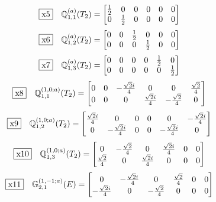 \documentclass[fleqn,10pt,landscape]{jsarticle}
\begin{document}
\begin{dmath*}
\fbox{x5}\quad \mathbb{Q}_{1,1}^{(a)}(T_{2})=\begin{bmatrix} \frac{1}{2} & 0 & 0 & 0 & 0 & 0 \\ 0 & \frac{1}{2} & 0 & 0 & 0 & 0 \end{bmatrix}
\end{dmath*}
\begin{dmath*}
\fbox{x6}\quad \mathbb{Q}_{1,2}^{(a)}(T_{2})=\begin{bmatrix} 0 & 0 & \frac{1}{2} & 0 & 0 & 0 \\ 0 & 0 & 0 & \frac{1}{2} & 0 & 0 \end{bmatrix}
\end{dmath*}
\begin{dmath*}
\fbox{x7}\quad \mathbb{Q}_{1,3}^{(a)}(T_{2})=\begin{bmatrix} 0 & 0 & 0 & 0 & \frac{1}{2} & 0 \\ 0 & 0 & 0 & 0 & 0 & \frac{1}{2} \end{bmatrix}
\end{dmath*}
\begin{dmath*}
\fbox{x8}\quad \mathbb{Q}_{1,1}^{(1,0;a)}(T_{2})=\begin{bmatrix} 0 & 0 & - \frac{\sqrt{2} i}{4} & 0 & 0 & \frac{\sqrt{2}}{4} \\ 0 & 0 & 0 & \frac{\sqrt{2} i}{4} & - \frac{\sqrt{2}}{4} & 0 \end{bmatrix}
\end{dmath*}
\begin{dmath*}
\fbox{x9}\quad \mathbb{Q}_{1,2}^{(1,0;a)}(T_{2})=\begin{bmatrix} \frac{\sqrt{2} i}{4} & 0 & 0 & 0 & 0 & - \frac{\sqrt{2} i}{4} \\ 0 & - \frac{\sqrt{2} i}{4} & 0 & 0 & - \frac{\sqrt{2} i}{4} & 0 \end{bmatrix}
\end{dmath*}
\begin{dmath*}
\fbox{x10}\quad \mathbb{Q}_{1,3}^{(1,0;a)}(T_{2})=\begin{bmatrix} 0 & - \frac{\sqrt{2}}{4} & 0 & \frac{\sqrt{2} i}{4} & 0 & 0 \\ \frac{\sqrt{2}}{4} & 0 & \frac{\sqrt{2} i}{4} & 0 & 0 & 0 \end{bmatrix}
\end{dmath*}
\begin{dmath*}
\fbox{x11}\quad \mathbb{G}_{2,1}^{(1,-1;a)}(E)=\begin{bmatrix} 0 & - \frac{\sqrt{2} i}{4} & 0 & \frac{\sqrt{2}}{4} & 0 & 0 \\ - \frac{\sqrt{2} i}{4} & 0 & - \frac{\sqrt{2}}{4} & 0 & 0 & 0 \end{bmatrix}
\end{dmath*}
\end{document}
